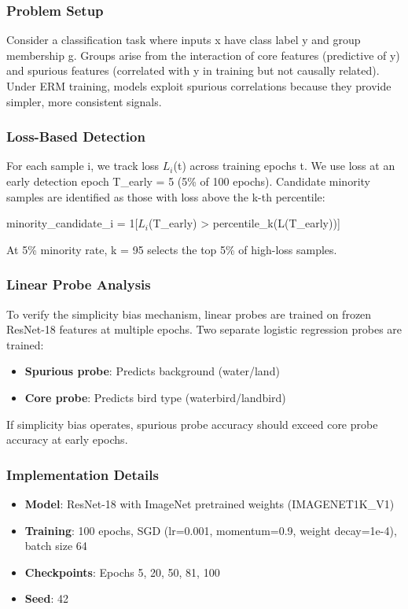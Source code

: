 
\subsubsection{Problem Setup}

Consider a classification task where inputs x have class label y and group membership g. Groups arise from the interaction of core features (predictive of y) and spurious features (correlated with y in training but not causally related). Under ERM training, models exploit spurious correlations because they provide simpler, more consistent signals.

\subsubsection{Loss-Based Detection}

For each sample i, we track loss $L_i$(t) across training epochs t. We use loss at an early detection epoch T\_early = 5 (5\% of 100 epochs). Candidate minority samples are identified as those with loss above the k-th percentile:

minority\_candidate\_i = 1[$L_i$(T\_early) > percentile\_k(L(T\_early))]

At 5\% minority rate, k = 95 selects the top 5\% of high-loss samples.

\subsubsection{Linear Probe Analysis}

To verify the simplicity bias mechanism, linear probes are trained on frozen ResNet-18 features at multiple epochs. Two separate logistic regression probes are trained:

\begin{itemize}
\item \textbf{Spurious probe}: Predicts background (water/land)
\item \textbf{Core probe}: Predicts bird type (waterbird/landbird)
\end{itemize}

If simplicity bias operates, spurious probe accuracy should exceed core probe accuracy at early epochs.

\subsubsection{Implementation Details}

\begin{itemize}
\item \textbf{Model}: ResNet-18 with ImageNet pretrained weights (IMAGENET1K\_V1)
\item \textbf{Training}: 100 epochs, SGD (lr=0.001, momentum=0.9, weight decay=1e-4), batch size 64
\item \textbf{Checkpoints}: Epochs 5, 20, 50, 81, 100
\item \textbf{Seed}: 42
\end{itemize}

